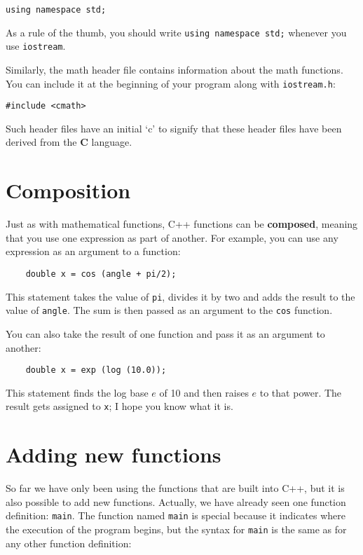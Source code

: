 \begin{lstlisting}
using namespace std;
\end{lstlisting}

As a rule of the thumb, you should write {\tt using namespace std;} whenever
you use {\tt iostream}.

Similarly, the math header file contains information
about the math functions.  You can include it at the beginning
of your program along with {\tt iostream.h}:

\begin{lstlisting}
#include <cmath>
\end{lstlisting}

Such header files have an initial `c' to signify that these
header files have been derived from the {\bf C} language.

\section {Composition}
\label{composition}

Just as with mathematical functions, C++ functions can be {\bf
composed}, meaning that you use one expression as part of another.
For example, you can use any expression as an argument to a function:

\begin{lstlisting}
    double x = cos (angle + pi/2);
\end{lstlisting}
%
This statement takes the value of {\tt pi}, divides it by two and
adds the result to the value of {\tt angle}.  The sum is
then passed as an argument to the {\tt cos} function.

You can also take the result of one function and pass it as
an argument to another:

\begin{lstlisting}
    double x = exp (log (10.0));
\end{lstlisting}
%
This
statement finds the log base $e$ of 10 and then raises $e$ to that
power.  The result gets assigned to {\tt x}; I hope you know what it
is.

\section{Adding new functions}

So far we have only been using the functions that are built into C++,
but it is also possible to add new functions.  Actually, we have already
seen one function definition: {\tt main}.  The function named {\tt main}
is special because it indicates where the execution of the program
begins, but the syntax for {\tt main} is the same as for any other
function definition:

